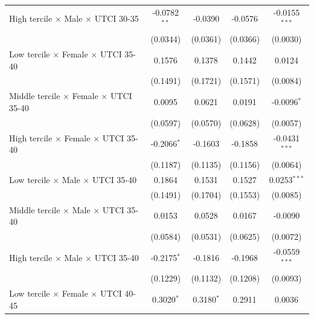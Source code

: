 \begin{table}[htbp]
\begin{tabular}{lcccc}
      High tercile $\times$ Male $\times$ UTCI 30-35       & -0.0782$^{**}$  & -0.0390             & -0.0576           & -0.0155$^{***}$\\   
                                                           & (0.0344)        & (0.0361)            & (0.0366)          & (0.0030)\\   
      Low tercile $\times$ Female $\times$ UTCI 35-40      & 0.1576          & 0.1378              & 0.1442            & 0.0124\\   
                                                           & (0.1491)        & (0.1721)            & (0.1571)          & (0.0084)\\   
      Middle tercile $\times$ Female $\times$ UTCI 35-40   & 0.0095          & 0.0621              & 0.0191            & -0.0096$^{*}$\\   
                                                           & (0.0597)        & (0.0570)            & (0.0628)          & (0.0057)\\   
      High tercile $\times$ Female $\times$ UTCI 35-40     & -0.2066$^{*}$   & -0.1603             & -0.1858           & -0.0431$^{***}$\\   
                                                           & (0.1187)        & (0.1135)            & (0.1156)          & (0.0064)\\   
      Low tercile $\times$ Male $\times$ UTCI 35-40        & 0.1864          & 0.1531              & 0.1527            & 0.0253$^{***}$\\   
                                                           & (0.1491)        & (0.1704)            & (0.1553)          & (0.0085)\\   
      Middle tercile $\times$ Male $\times$ UTCI 35-40     & 0.0153          & 0.0528              & 0.0167            & -0.0090\\   
                                                           & (0.0584)        & (0.0531)            & (0.0625)          & (0.0072)\\   
      High tercile $\times$ Male $\times$ UTCI 35-40       & -0.2175$^{*}$   & -0.1816             & -0.1968           & -0.0559$^{***}$\\   
                                                           & (0.1229)        & (0.1132)            & (0.1208)          & (0.0093)\\   
      Low tercile $\times$ Female $\times$ UTCI 40-45      & 0.3020$^{*}$    & 0.3180$^{*}$        & 0.2911            & 0.0036\\   

\end{tabular}
\end{table}
